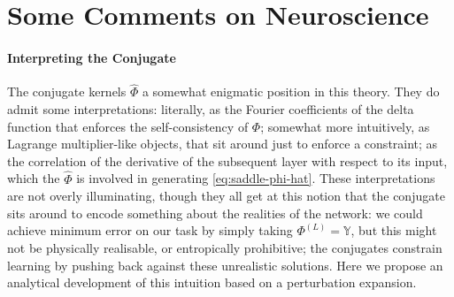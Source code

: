 \documentclass[../main.tex]{subfiles}
\begin{document}
\section{Some Comments on Neuroscience}
\label{sec:comments}

\paragraph{Interpreting the Conjugate}

The conjugate kernels $\hat \Phi$  a somewhat enigmatic position in this theory. They do admit some interpretations: literally, as the Fourier coefficients of the delta function that enforces the self-consistency of $\Phi$; somewhat more intuitively, as Lagrange multiplier-like objects, that sit around just to enforce a constraint; as the correlation of the derivative of the subsequent layer with respect to its input, which the $\hat \Phi$ is involved in generating \eqref{eq:saddle-phi-hat}. These interpretations are not overly illuminating, though they all get at this notion that the conjugate sits around to encode something about the realities of the network: we could achieve minimum error on our task by simply taking $\Phi^{(L)}=\mathbb Y$, but this might not be physically realisable, or entropically prohibitive; the conjugates constrain learning by pushing back against these unrealistic solutions. Here we propose an analytical development of this intuition based on a perturbation expansion.
\end{document}
